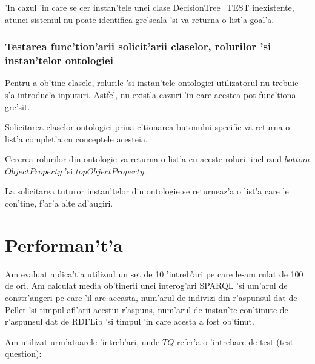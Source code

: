 \documentclass[12pt,a4paper,twoside]{report}
\begin{document}
'In cazul 'in care se cer instan'tele unei clase DecisionTree\_TEST inexistente, atunci sistemul nu poate identifica gre'seala 'si va returna o list'a goal'a.

\subsubsection{Testarea func'tion'arii solicit'arii claselor, rolurilor 'si instan'telor ontologiei}
Pentru a ob'tine clasele, rolurile 'si instan'tele ontologiei utilizatorul nu trebuie s'a introduc'a inputuri. Astfel, nu exist'a cazuri 'in care acestea pot func'tiona gre'sit.

Solicitarea claselor ontologiei prina c'tionarea butonului specific va returna o list'a complet'a cu conceptele acesteia.

Cererea rolurilor din ontologie va returna o list'a cu aceste roluri, incluz\ia nd $bottom$ $ObjectProperty$ 'si $topObjectProperty$.

La solicitarea tuturor instan'telor din ontologie se returneaz'a o list'a care le con'tine, f'ar'a alte ad'augiri.

\section{Performan't'a}

Am evaluat aplica'tia utiliz\ia nd un set de 10 'intreb'ari pe care le-am rulat de 100 de ori. Am calculat media ob'tinerii unei interog'ari SPARQL 'si um'arul de constr'angeri pe care 'il are aceasta, num'arul de indivizi din r'aspunsul dat de Pellet 'si timpul afl'arii acestui r'aspuns, num'arul de instan'te con'tinute de r'aspunsul dat de RDFLib 'si timpul 'in care acesta a fost ob'tinut. 

Am utilizat urm'atoarele 'intreb'ari, unde $TQ$ refer'a o 'intrebare de test (test question):
\newline
\end{document}
